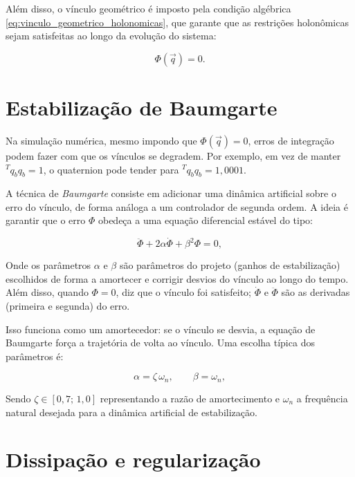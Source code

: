 Além disso, o vínculo geométrico é imposto pela condição algébrica \eqref{eq:vinculo_geometrico_holonomicas}, que garante que as restrições holonômicas sejam satisfeitas ao longo da evolução do sistema:

\begin{equation}
    \label{eq:vinculo_geometrico_holonomicas}
\Phi(\vec{q}) = 0.
\end{equation}

\section{Estabilização de Baumgarte}

Na simulação numérica, mesmo impondo que $\Phi(\vec q) = 0$, erros de integração podem fazer com que os vínculos se degradem. 
Por exemplo, em vez de manter ${}^T q_b q_b = 1$, o quaternion pode tender para ${}^T q_b q_b = 1,0001$.

A técnica de \emph{Baumgarte} consiste em adicionar uma dinâmica artificial sobre o erro do vínculo, de forma análoga a um controlador de segunda ordem. 
A ideia é garantir que o erro $\Phi$ obedeça a uma equação diferencial estável do tipo:

\begin{equation}
    \label{eq:condicoes_Baumgarte}
    \ddot{\Phi} + 2 \alpha \dot{\Phi} + \beta^2 \Phi = 0,
\end{equation}

Onde os parâmetros $\alpha$ e $\beta$ são parâmetros do projeto (ganhos de estabilização) escolhidos de forma a amortecer e corrigir desvios do vínculo ao longo do tempo. Além disso, quando $\Phi = 0$, diz que o vínculo foi satisfeito; $\dot \Phi$ e $\ddot \Phi$ são as derivadas (primeira e segunda) do erro.

Isso funciona como um amortecedor: se o vínculo se desvia, a equação de Baumgarte 
força a trajetória de volta ao vínculo. Uma escolha típica dos parâmetros é:

\begin{equation}
    \alpha = \zeta \, \omega_n, 
    \qquad 
    \beta = \omega_n,
\end{equation}

Sendo $\zeta \in [0,7;\,1,0]$ representando a razão de amortecimento 
e $\omega_n$ a frequência natural desejada para a dinâmica artificial de estabilização.

\section{Dissipação e regularização}


